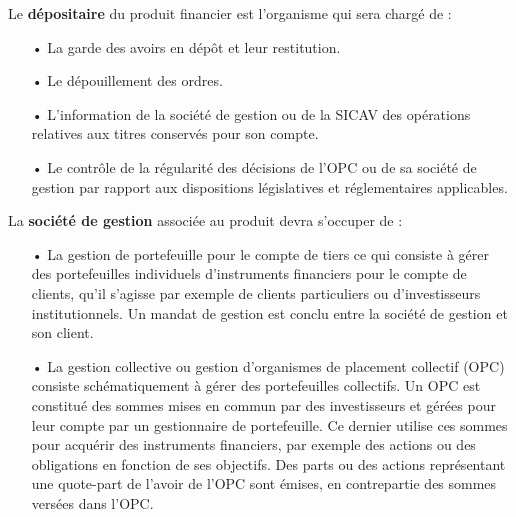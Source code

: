 \documentclass[french,12pt,a4paper]{article}
\begin{document}
Le \textbf{dépositaire} du produit financier est l'organisme qui sera chargé de :\\
\begin{itemize}
\item[•]
	La garde des avoirs en dépôt et leur restitution.
\item[•]
	Le dépouillement des ordres.
\item[•]
	L'information de la société de gestion ou de la SICAV des opérations relatives aux titres conservés pour son compte.
\item[•]
	Le contrôle de la régularité des décisions de l'OPC ou de sa société de gestion par rapport aux dispositions législatives et réglementaires applicables.\\
\end{itemize}


La \textbf{société de gestion} associée au produit devra s'occuper de :\\
\begin{itemize}
\item[•]
	La gestion de portefeuille pour le compte de tiers ce qui consiste à gérer des portefeuilles individuels d'instruments financiers pour le compte de clients, qu'il s'agisse par exemple de clients particuliers ou d'investisseurs institutionnels. Un mandat de gestion est conclu entre la société de gestion et son client.
\item[•]
	La gestion collective ou gestion d’organismes de placement collectif (OPC) consiste schématiquement à gérer des portefeuilles collectifs. Un OPC est constitué des sommes mises en commun par des investisseurs et gérées pour leur compte par un gestionnaire de portefeuille. Ce dernier utilise ces sommes pour acquérir des instruments financiers, par exemple des actions ou des obligations en fonction de ses objectifs. Des parts ou des actions représentant une quote-part de l’avoir de l’OPC sont émises, en contrepartie des sommes versées dans l’OPC. \\
\end{itemize}
\end{document}
